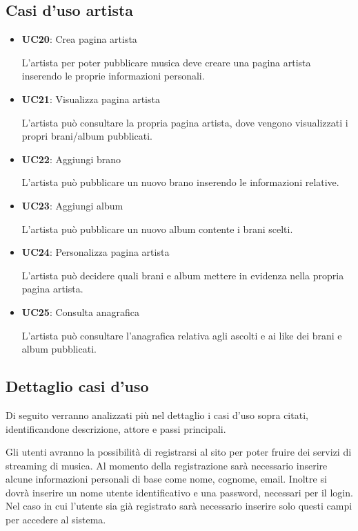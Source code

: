 \subsection{Casi d'uso artista}
\begin{itemize}
      \item \textbf{UC20}: Crea pagina artista 
      
      L'artista per poter pubblicare musica deve
            creare una pagina artista inserendo le proprie informazioni personali.
      \item  \textbf{UC21}: Visualizza pagina artista 
      
      L'artista può consultare la propria
            pagina artista, dove vengono visualizzati i propri brani/album pubblicati.
      \item  \textbf{UC22}: Aggiungi brano 
      
      L'artista può pubblicare un nuovo brano
            inserendo le informazioni relative.
      \item  \textbf{UC23}: Aggiungi album 
      
      L'artista può pubblicare un nuovo album contente
            i brani scelti.
      \item  \textbf{UC24}: Personalizza pagina artista 
      
      L'artista può decidere quali brani
            e album mettere in evidenza nella propria pagina artista.
      \item  \textbf{UC25}: Consulta anagrafica 
      
      L'artista può consultare l'anagrafica
            relativa agli ascolti e ai like dei brani e album pubblicati.

\end{itemize}


\vspace{1cm}
\subsection{Dettaglio casi d'uso}
Di seguito verranno analizzati più nel dettaglio i casi d’uso sopra citati, identificandone descrizione, attore e passi principali.

Gli utenti avranno la possibilità di registrarsi al sito per poter fruire dei servizi di streaming di musica. Al momento della registrazione sarà necessario inserire alcune informazioni personali di base come nome, cognome, email. Inoltre si dovrà inserire un nome utente identificativo e una password, necessari per il login. Nel caso in cui l’utente sia già registrato sarà necessario inserire solo questi campi per accedere al sistema. 

